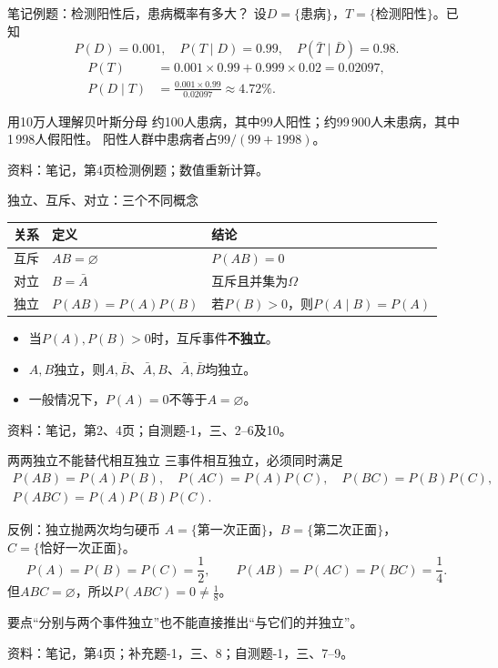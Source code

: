 \documentclass[aspectratio=169,10pt]{beamer}
\newcommand{\source}[1]{\vfill{\color{Muted}\fontsize{6.5}{8}\selectfont 资料：#1\par}}
\newcommand{\key}[1]{\begin{block}{要点}#1\end{block}}
\begin{document}
\begin{frame}[t]{笔记例题：检测阳性后，患病概率有多大？}
设$D=\{\text{患病}\}$，$T=\{\text{检测阳性}\}$。已知
\[
P(D)=0.001,\quad P(T\mid D)=0.99,\quad P(\bar T\mid\bar D)=0.98.
\]
\begin{align*}
P(T)&=0.001\times0.99+0.999\times0.02=0.02097,\\[1mm]
P(D\mid T)&=\frac{0.001\times0.99}{0.02097}\approx\boxed{4.72\%}.
\end{align*}
\begin{block}{用10万人理解贝叶斯分母}
约100人患病，其中99人阳性；约99\,900人未患病，其中1\,998人假阳性。
阳性人群中患病者占$99/(99+1998)$。
\end{block}
\source{笔记，第4页检测例题；数值重新计算。}
\end{frame}

\begin{frame}[t]{独立、互斥、对立：三个不同概念}
\renewcommand{\arraystretch}{1.5}
\begin{tabular}{p{1.8cm}p{5.2cm}p{6cm}}
\toprule
关系 & 定义 & 结论\\\midrule
互斥 & $AB=\varnothing$ & $P(AB)=0$\\
对立 & $B=\bar A$ & 互斥且并集为$\Omega$\\
独立 & $P(AB)=P(A)P(B)$ & 若$P(B)>0$，则$P(A\mid B)=P(A)$\\\bottomrule
\end{tabular}
\vspace{3mm}
\begin{itemize}
\item 当$P(A),P(B)>0$时，互斥事件\textbf{不独立}。
\item $A,B$独立，则$A,\bar B$、$\bar A,B$、$\bar A,\bar B$均独立。
\item 一般情况下，$P(A)=0$不等于$A=\varnothing$。
\end{itemize}
\source{笔记，第2、4页；自测题-1，三、2--6及10。}
\end{frame}

\begin{frame}[t]{两两独立不能替代相互独立}
三事件相互独立，必须同时满足
\[
\begin{gathered}
P(AB)=P(A)P(B),\quad P(AC)=P(A)P(C),\quad P(BC)=P(B)P(C),\\
P(ABC)=P(A)P(B)P(C).
\end{gathered}
\]
\begin{block}{反例：独立抛两次均匀硬币}
$A=\{\text{第一次正面}\}$，$B=\{\text{第二次正面}\}$，$C=\{\text{恰好一次正面}\}$。
\[
P(A)=P(B)=P(C)=\frac12,\qquad P(AB)=P(AC)=P(BC)=\frac14.
\]
但$ABC=\varnothing$，所以$P(ABC)=0\ne\frac18$。
\end{block}
\key{“分别与两个事件独立”也不能直接推出“与它们的并独立”。}
\source{笔记，第4页；补充题-1，三、8；自测题-1，三、7--9。}
\end{frame}
\end{document}
